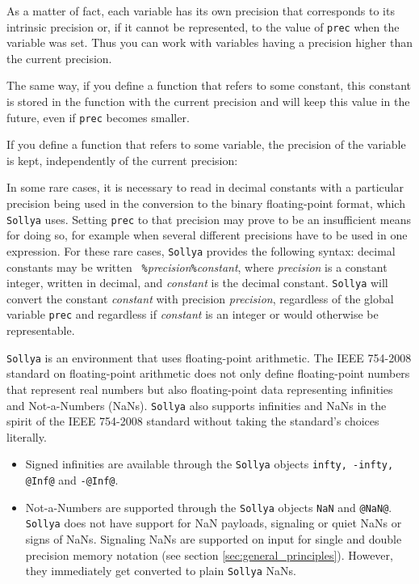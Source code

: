 \documentclass[a4paper]{article}
\newcommand{\com}[1]{\texttt{#1}}
\newcommand{\key}[1]{\texttt{#1}}
\newcommand{\sollya}{\texttt{Sollya}\xspace}
\begin{document}


As a matter of fact, each variable has its own precision that corresponds to its intrinsic precision or, if it cannot be represented, to the value of \com{prec} when the variable was set. Thus you can work with variables having a precision higher than the current precision.

The same way, if you define a function that refers to some constant, this constant is stored in the function with the current precision and will keep this value in the future, even if \com{prec} becomes smaller.

If you define a function that refers to some variable, the precision of the variable is kept, independently of the current precision:



In some rare cases, it is necessary to read in decimal constants with
a particular precision being used in the conversion to the binary
floating-point format, which \sollya uses. Setting \key{prec} to that
precision may prove to be an insufficient means for doing so, for
example when several different precisions have to be used in one
expression. For these rare cases, \sollya provides the following
syntax: decimal constants may be written {\tt
  \%}\emph{precision}{\tt\%}\emph{constant}, where \emph{precision} is
a constant integer, written in decimal, and \emph{constant} is the
decimal constant. \sollya will convert the constant \emph{constant}
with precision \emph{precision}, regardless of the global variable
\key{prec} and regardless if \emph{constant} is an integer or would
otherwise be representable.



\sollya is an environment that uses floating-point arithmetic. The
IEEE 754-2008 standard on floating-point arithmetic does not only
define floating-point numbers that represent real numbers but also
floating-point data representing infinities and Not-a-Numbers (NaNs).
\sollya also supports infinities and NaNs in the spirit of the IEEE
754-2008 standard without taking the standard's choices literally. 

\begin{itemize}
\item Signed infinities are available through the \sollya objects
\texttt{infty, -infty, @Inf@} and \texttt{-@Inf@}.
\item Not-a-Numbers are supported through the \sollya objects
\texttt{NaN} and \texttt{@NaN@}. \sollya does not have support for NaN
payloads, signaling or quiet NaNs or signs of NaNs. Signaling NaNs
are supported on input for single and double precision memory
notation (see section \ref{sec:general_principles}). However, they
immediately get converted to plain \sollya NaNs.
\end{itemize}
\end{document}

